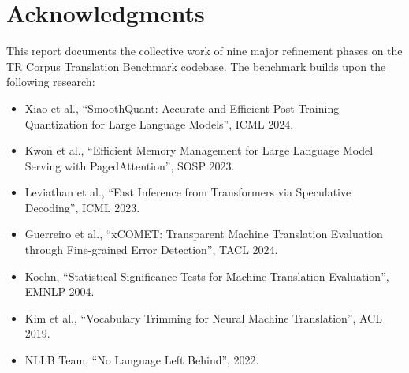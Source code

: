 \documentclass[11pt,a4paper,twoside]{article}
\begin{document}
\section*{Acknowledgments}

This report documents the collective work of nine major refinement phases on the
TR Corpus Translation Benchmark codebase. The benchmark builds upon the following
research:

\begin{itemize}[nosep]
  \item Xiao et al., ``SmoothQuant: Accurate and Efficient Post-Training
    Quantization for Large Language Models'', ICML 2024.
  \item Kwon et al., ``Efficient Memory Management for Large Language Model
    Serving with PagedAttention'', SOSP 2023.
  \item Leviathan et al., ``Fast Inference from Transformers via Speculative
    Decoding'', ICML 2023.
  \item Guerreiro et al., ``xCOMET: Transparent Machine Translation Evaluation
    through Fine-grained Error Detection'', TACL 2024.
  \item Koehn, ``Statistical Significance Tests for Machine Translation
    Evaluation'', EMNLP 2004.
  \item Kim et al., ``Vocabulary Trimming for Neural Machine Translation'',
    ACL 2019.
  \item NLLB Team, ``No Language Left Behind'', 2022.
\end{itemize}
\end{document}
